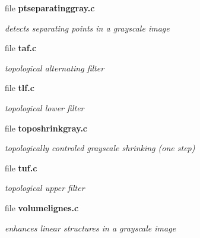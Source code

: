 \begin{DoxyCompactItemize}
\item 
file {\bf ptseparatinggray.c}


\begin{DoxyCompactList}\small\item\em detects separating points in a grayscale image \item\end{DoxyCompactList}

\item 
file {\bf taf.c}


\begin{DoxyCompactList}\small\item\em topological alternating filter \item\end{DoxyCompactList}

\item 
file {\bf tlf.c}


\begin{DoxyCompactList}\small\item\em topological lower filter \item\end{DoxyCompactList}

\item 
file {\bf toposhrinkgray.c}


\begin{DoxyCompactList}\small\item\em topologically controled grayscale shrinking (one step) \item\end{DoxyCompactList}

\item 
file {\bf tuf.c}


\begin{DoxyCompactList}\small\item\em topological upper filter \item\end{DoxyCompactList}

\item 
file {\bf volumelignes.c}


\begin{DoxyCompactList}\small\item\em enhances linear structures in a grayscale image \item\end{DoxyCompactList}

\end{DoxyCompactItemize}
